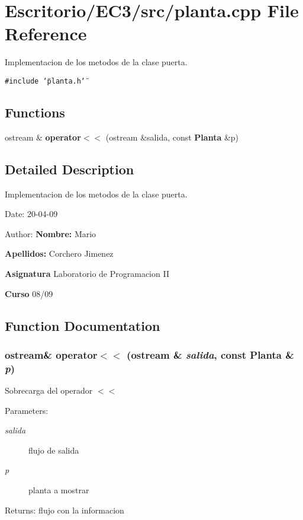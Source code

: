 \section{Escritorio/EC3/src/planta.cpp File Reference}
\label{planta_8cpp}
Implementacion de los metodos de la clase puerta. 

{\tt \#include \char`\"{}planta.h\char`\"{}}\par
\subsection*{Functions}
\begin{CompactItemize}
\item 
ostream \& {\bf operator$<$$<$} (ostream \&salida, const {\bf Planta} \&p)
\end{CompactItemize}


\subsection{Detailed Description}
Implementacion de los metodos de la clase puerta. 

\begin{Desc}
\item[Date:]20-04-09 \end{Desc}
\begin{Desc}
\item[Author:]{\bf Nombre:} Mario \par
 {\bf Apellidos:} Corchero Jimenez \par
 {\bf Asignatura} Laboratorio de Programacion II \par
 {\bf Curso} 08/09 \end{Desc}


\subsection{Function Documentation}
\subsubsection{\setlength{\rightskip}{0pt plus 5cm}ostream\& operator$<$$<$ (ostream \& {\em salida}, const {\bf Planta} \& {\em p})}\label{planta_8cpp_319bef3f6e27b792e645f3db7bc82726}


Sobrecarga del operador $<$$<$ \begin{Desc}
\item[Parameters:]
\begin{description}
\item[{\em salida}]flujo de salida \item[{\em p}]planta a mostrar \end{description}
\end{Desc}
\begin{Desc}
\item[Returns:]flujo con la informacion \end{Desc}
